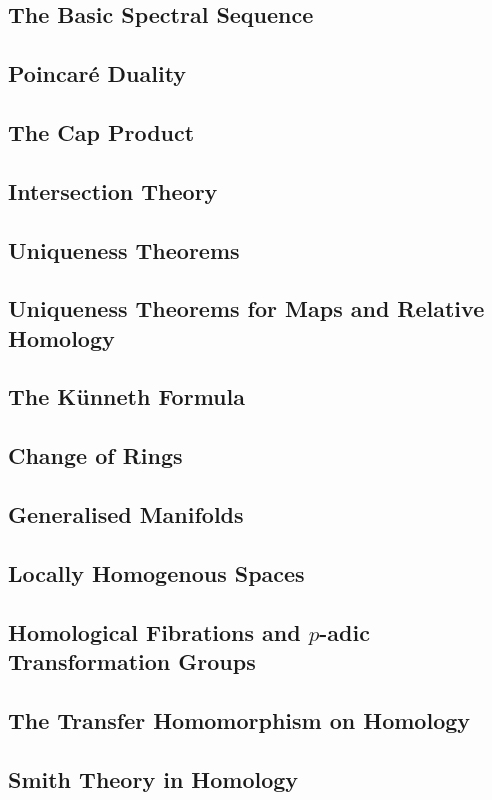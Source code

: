 \subsection{The Basic Spectral Sequence}
\subsection{Poincaré Duality}
\subsection{The Cap Product}
\subsection{Intersection Theory}
\subsection{Uniqueness Theorems}
\subsection{Uniqueness Theorems for Maps and Relative Homology}
\subsection{The Künneth Formula}
\subsection{Change of Rings}
\subsection{Generalised Manifolds}
\subsection{Locally Homogenous Spaces}
\subsection{Homological Fibrations and $p$-adic Transformation Groups}
\subsection{The Transfer Homomorphism on Homology}
\subsection{Smith Theory in Homology}

